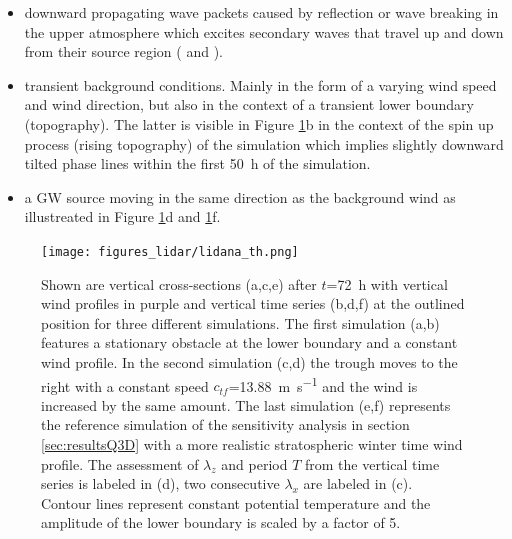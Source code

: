 \begin{itemize}
    \item downward propagating wave packets caused by reflection or wave breaking in the upper atmosphere which excites secondary waves that travel up and down from their source region (\cite[]{dornbrack_interpretation_2017} and \cite[]{vadas_mechanism_2003}).

    \item transient background conditions. Mainly in the form of a varying wind speed and wind direction, but also in the context of a transient lower boundary (topography). The latter is visible in Figure \ref{fig:lidar_sim}b in the context of the spin up process (rising topography) of the simulation which implies slightly downward tilted phase lines within the first \SI{50}{\hour} of the simulation.

    \item a GW source moving in the same direction as the background wind as illustreated in Figure \ref{fig:lidar_sim}d and \ref{fig:lidar_sim}f.
\end{itemize}

\begin{figure}[tbp]
    \centering
    \texttt{[image: figures\_lidar/lidana\_th.png]}
    \caption{Shown are vertical cross-sections (a,c,e) after $t$=\SI{72}{\hour} with vertical wind profiles in purple and vertical time series (b,d,f) at the outlined position for three different simulations. The first simulation (a,b) features a stationary obstacle at the lower boundary and a constant wind profile. In the second simulation (c,d) the trough moves to the right with a constant speed $c_{tf}$=\SI{13.88}{\meter \per \second} and the wind is increased by the same amount. The last simulation (e,f) represents the reference simulation of the sensitivity analysis in section \ref{sec:resultsQ3D} with a more realistic stratospheric winter time wind profile. The assessment of $\lambda_z$ and period $T$ from the vertical time series is labeled in (d), two consecutive $\lambda_x$ are labeled in (c). Contour lines represent constant potential temperature and the amplitude of the lower boundary is scaled by a factor of 5.}
    \label{fig:lidar_sim}
\end{figure}

